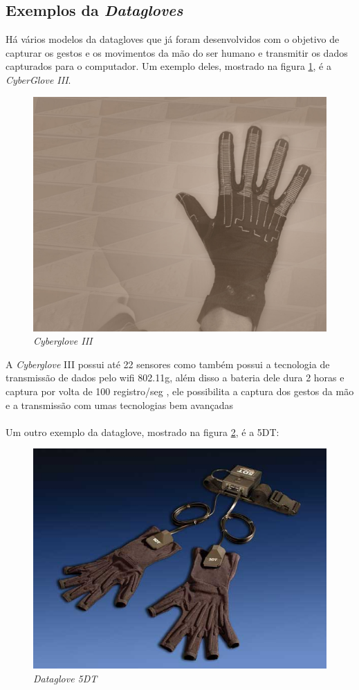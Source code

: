 \documentclass[12pt]{article}
\begin{document}
\subsection{Exemplos da \textit{Datagloves}}

Há vários modelos da datagloves que já foram desenvolvidos com o objetivo de capturar os gestos e os movimentos da mão do ser humano e transmitir os dados capturados para o computador. Um exemplo deles, mostrado na figura \ref{fig:cyberglove3-2}, é a \textit{CyberGlove III}.

\begin{figure}[H]
    \centering
    \includegraphics[width=.7\textwidth]{images/cyberglove-iii-2.jpg}
    \caption{\textit{Cyberglove III}}
    \label{fig:cyberglove3-2}
\end{figure}

A \textit{Cyberglove} III possui até 22 sensores como também possui a tecnologia de transmissão de dados pelo wifi 802.11g, além disso a bateria dele dura 2 horas e captura por volta de 100 registro/seg , ele possibilita a captura dos gestos da mão e a transmissão com umas tecnologias bem avançadas \cite{mardiyanto_2017}
\\ \\ Um outro exemplo da dataglove, mostrado na figura \ref{fig:hw_data_glove_wireless_01}, é a 5DT:

\begin{figure}[H]
    \centering
    \includegraphics[width=.7\textwidth]{images/hw_data_glove_wireless_01.jpg}
    \caption{\textit{Dataglove 5DT}}
    \label{fig:hw_data_glove_wireless_01}
\end{figure}
\end{document}
